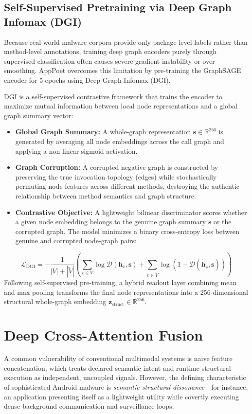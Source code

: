\documentclass[12pt,a4paper,oneside]{report}
\begin{document}
\subsection{Self-Supervised Pretraining via Deep Graph Infomax (DGI)}
Because real-world malware corpora provide only package-level labels rather than method-level annotations, training deep graph encoders purely through supervised classification often causes severe gradient instability or over-smoothing. AppPoet overcomes this limitation by pre-training the GraphSAGE encoder for 5 epochs using Deep Graph Infomax (DGI).

DGI is a self-supervised contrastive framework that trains the encoder to maximize mutual information between local node representations and a global graph summary vector:
\begin{itemize}
    \item \textbf{Global Graph Summary:} A whole-graph representation $\mathbf{s} \in \mathbb{R}^{256}$ is generated by averaging all node embeddings across the call graph and applying a non-linear sigmoid activation.
    \item \textbf{Graph Corruption:} A corrupted negative graph is constructed by preserving the true invocation topology (edges) while stochastically permuting node features across different methods, destroying the authentic relationship between method semantics and graph structure.
    \item \textbf{Contrastive Objective:} A lightweight bilinear discriminator scores whether a given node embedding belongs to the genuine graph summary $\mathbf{s}$ or the corrupted graph. The model minimizes a binary cross-entropy loss between genuine and corrupted node-graph pairs:
\end{itemize}
\begin{equation}
    \mathcal{L}_{\text{DGI}} = - \frac{1}{|V| + |\widetilde{V}|} \left( \sum_{v \in V} \log \mathcal{D}(\mathbf{h}_v, \mathbf{s}) + \sum_{\tilde{v} \in \widetilde{V}} \log \left( 1 - \mathcal{D}(\widetilde{\mathbf{h}}_{\tilde{v}}, \mathbf{s}) \right) \right)
\end{equation}
Following self-supervised pre-training, a hybrid readout layer combining mean and max pooling transforms the final node representations into a 256-dimensional structural whole-graph embedding $\mathbf{z}_{\text{struct}} \in \mathbb{R}^{256}$.

\section{Deep Cross-Attention Fusion}
A common vulnerability of conventional multimodal systems is naive feature concatenation, which treats declared semantic intent and runtime structural execution as independent, uncoupled signals. However, the defining characteristic of sophisticated Android malware is \textit{semantic-structural dissonance}---for instance, an application presenting itself as a lightweight utility while covertly executing dense background communication and surveillance loops.
\end{document}
